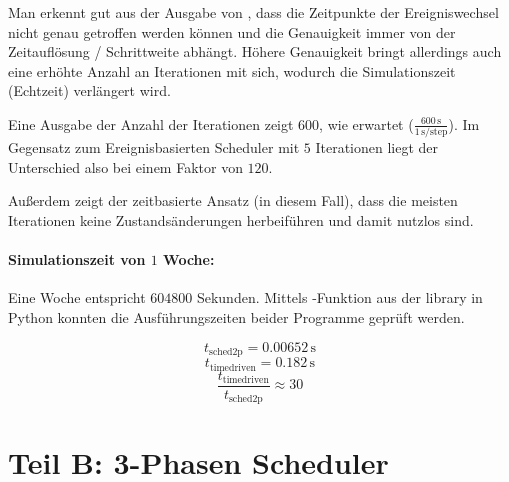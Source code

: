 \documentclass[11pt, a4paper]{article}
\begin{document}
Man erkennt gut aus der Ausgabe von , dass die Zeitpunkte der Ereigniswechsel nicht genau getroffen werden können und die Genauigkeit immer von der Zeitauflösung / Schrittweite abhängt. Höhere Genauigkeit bringt allerdings auch eine erhöhte Anzahl an Iterationen mit sich, wodurch die Simulationszeit (Echtzeit) verlängert wird.

Eine Ausgabe der Anzahl der Iterationen zeigt $600$, wie erwartet ($\frac{600\,\si{\second}}{1\,\si{\second}/\text{step}}$). Im Gegensatz zum Ereignisbasierten Scheduler mit $5$ Iterationen liegt der Unterschied also bei einem Faktor von $120$.

Außerdem zeigt der zeitbasierte Ansatz (in diesem Fall), dass die meisten Iterationen keine Zustandsänderungen herbeiführen und damit nutzlos sind.

\paragraph{Simulationszeit von $1$ Woche:}
Eine Woche entspricht $604800$ Sekunden. Mittels -Funktion aus der  library in Python konnten die Ausführungszeiten beider Programme geprüft werden.

\[t_{\text{sched2p}} = 0.00652\,\si{\second}\]
\[t_{\text{timedriven}} = 0.182 \,\si{\second}\]
\[\frac{t_{\text{timedriven}}}{t_{\text{sched2p}}} \approx 30\]

\section{Teil B: 3-Phasen Scheduler}

\end{document}
